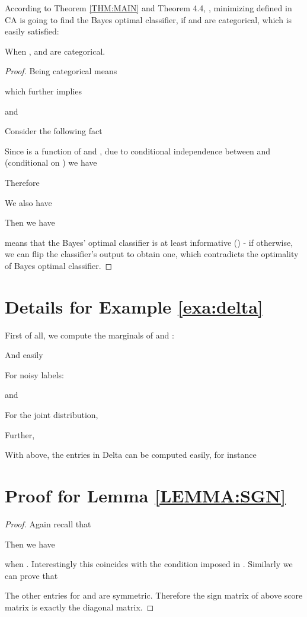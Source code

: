  According to Theorem \ref{THM:MAIN} and Theorem 4.4,  \cite{shnayder2016informed}, minimizing  defined in CA is going to find the Bayes optimal classifier, if  and  are categorical, which is easily satisfied:
\begin{lemma}\label{LEMMA:CATE}
When ,  and  are categorical. 
\end{lemma}

\begin{proof}
Being categorical means

which further implies

and

Consider the following fact

Since  is a function of  and , due to conditional independence between  and  (conditional on ) we have

Therefore

We also have

Then we have

 means that the Bayes' optimal classifier is at least informative (\citep{sub:ec17}) - if otherwise, we can flip the classifier's output to obtain one, which contradicts the optimality of Bayes optimal classifier.

\end{proof}


\section*{Details for Example \ref{exa:delta}}


First of all, we compute the marginals of  and :

And easily

For noisy labels:

and

For the joint distribution,


Further, 

With above, the entries in Delta can be computed easily, for instance



\section*{Proof for Lemma \ref{LEMMA:SGN} }

\begin{proof}
Again recall that 


Then we have

when . Interestingly this coincides with the condition imposed in \citep{natarajan2013learning}. Similarly we can prove that 

The other entries for  and  are symmetric.
Therefore the sign matrix of above score matrix is exactly the diagonal matrix.
\end{proof}

